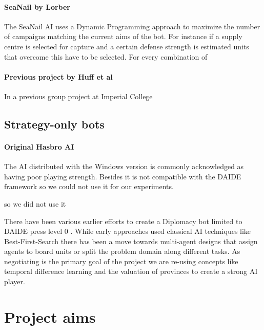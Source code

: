 \documentclass[pdftex,12pt,a4paper]{report}
\begin{document}
\paragraph{SeaNail by Lorber}

The SeaNail AI \cite{Lorber98} uses a Dynamic Programming approach to
maximize the number of campaigns matching the current aims of the
bot. For instance if a supply centre is selected for capture and a
certain defense strength is estimated units that overcome this have to
be selected. For every combination of

\paragraph{Previous project by Huff et al}

In a previous group project at Imperial College \cite{Huff05}

\subsection{Strategy-only bots}

\paragraph{Original Hasbro AI}
The AI distributed with the Windows version is commonly 
acknowledged as having poor playing strength. Besides it is not
compatible with the DAIDE framework so we could not use it for
our experiments.

 so we did not use
it 

There have been various earlier efforts to create a Diplomacy bot
limited to DAIDE press level 0 \cite{DAIDEsyntax10}. While early
approaches used classical AI techniques like Best-First-Search there
has been a move towards multi-agent designs that assign agents to
board units or split the problem domain along different tasks. As
negotiating is the primary goal of the project we are re-using
concepts like temporal difference learning \cite{Levinson94} and the
valuation of provinces \cite{Huff05} to create a strong AI player.


\pagebreak

\section{Project aims}
\end{document}
